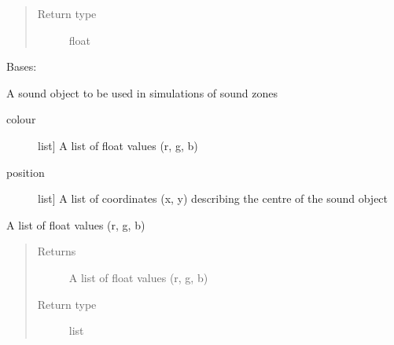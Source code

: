 \documentclass[letterpaper,10pt,english]{sphinxmanual}
\begin{document}
\begin{fulllineitems}
\begin{fulllineitems}
\begin{quote}
\begin{description}
\item[{Return type}] \leavevmode
float

\end{description}\end{quote}

\end{fulllineitems}


\end{fulllineitems}


\begin{fulllineitems}
\label{\detokenize{source/pyzones:pyzones.SoundObject}}
Bases: 

A sound object to be used in simulations of sound zones
\begin{description}
\item[{colour}] \leavevmode{[}list{]}
A list of float values (r, g, b)

\item[{position}] \leavevmode{[}list{]}
A list of coordinates (x, y) describing the centre of the sound object

\end{description}

\begin{fulllineitems}
\label{\detokenize{source/pyzones:pyzones.SoundObject.colour}}
A list of float values (r, g, b)
\begin{quote}\begin{description}
\item[{Returns}] \leavevmode
A list of float values (r, g, b)

\item[{Return type}] \leavevmode
list

\end{description}\end{quote}

\end{fulllineitems}



\end{fulllineitems}
\end{document}
